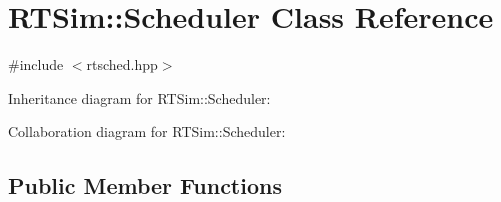 \hypertarget{classRTSim_1_1Scheduler}{}\section{R\+T\+Sim\+:\+:Scheduler Class Reference}
\label{classRTSim_1_1Scheduler}


{\ttfamily \#include $<$rtsched.\+hpp$>$}



Inheritance diagram for R\+T\+Sim\+:\+:Scheduler\+:


Collaboration diagram for R\+T\+Sim\+:\+:Scheduler\+:
\subsection*{Public Member Functions}
